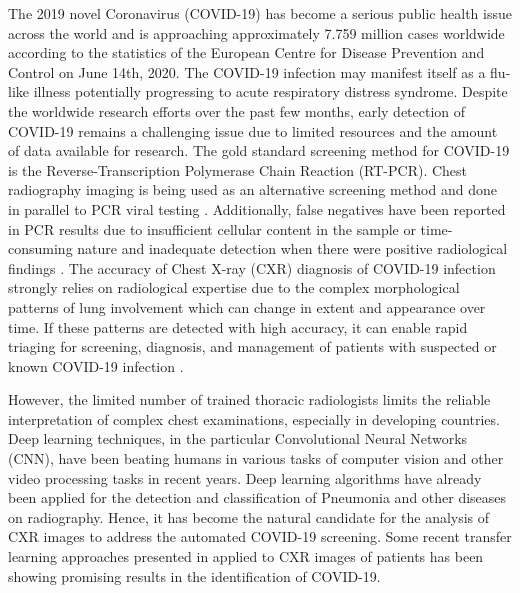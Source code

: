  The 2019 novel Coronavirus (COVID-19) has become a serious public health issue across the world and is approaching approximately 7.759 million cases worldwide according to the statistics of the European Centre for Disease Prevention and Control on June 14th, 2020. The COVID-19 infection may manifest itself as a flu-like illness potentially progressing to acute respiratory distress syndrome. Despite the worldwide research efforts over the past few months, early detection of COVID-19 remains a challenging issue due to limited resources and the amount of data available for research. The gold standard screening method for COVID-19 is the Reverse-Transcription Polymerase Chain Reaction (RT-PCR). Chest radiography imaging is being used as an alternative screening method and done in parallel to PCR viral testing  \cite{wang2020covid}.  Additionally, false negatives have been reported in PCR results due to insufficient cellular content in the sample or time-consuming nature and inadequate detection when there were positive radiological findings \cite{araujo2020covid}. The accuracy of Chest X-ray (CXR) diagnosis of COVID-19 infection strongly relies on radiological expertise due to the complex morphological patterns of lung involvement which can change in extent and appearance over time. If these patterns are detected with high accuracy, it can enable rapid triaging for
screening, diagnosis, and management of patients with suspected or known COVID-19 infection \cite{luz2020efficient}.

However, the limited number of trained thoracic radiologists limits the reliable interpretation of complex chest examinations, especially in developing countries. Deep learning techniques, in the particular Convolutional Neural Networks (CNN), have been beating humans in various tasks of computer vision and other video processing tasks in recent years. Deep learning algorithms have already been applied for the detection and classification of Pneumonia \cite{rajpurkar2017chexnet, zech2018variable} and other diseases on radiography. Hence, it has become the natural candidate for the analysis of CXR images to address the automated COVID-19 screening. Some recent transfer learning approaches presented in \cite{chowdhury2020can, wang2020covid, butt2020deep, farooq2020covid, luz2020efficient} applied to CXR images of patients has been showing promising results in the identification of COVID-19. 
 
